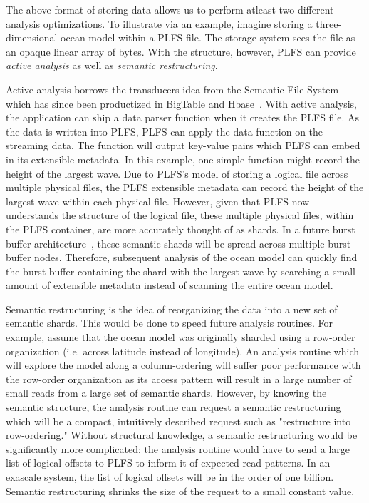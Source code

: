 The above format of storing data allows us to perform atleast two different analysis optimizations.  To illustrate via an example, imagine storing a three-dimensional ocean model within a PLFS file. The storage system sees the file as an opaque linear array of bytes.  With the structure, however, PLFS can provide \textit{active analysis} as well as \textit{semantic restructuring}.  

Active analysis borrows the transducers idea from the Semantic File System~\cite{semantic_fs} which has since been productized in BigTable and Hbase~\cite{google_coprocessors,GFS,apache_hbase}.  With active analysis, the application can ship a data parser function when it creates the PLFS file.  As the data is written into PLFS, PLFS can apply the data function on the streaming data.  The function will output key-value pairs which PLFS can embed in its extensible metadata.  In this example, one simple function might record the height of the largest wave.  Due to PLFS's model of storing a logical file across multiple physical files, the PLFS extensible metadata can record the height of the largest wave within each physical file.  However, given that PLFS now understands the structure of the logical file, these multiple physical files, within the PLFS container, are more accurately thought of as shards.  In a future burst buffer architecture~\cite{burst_buffers}, these semantic shards will be spread across multiple burst buffer nodes.  Therefore, subsequent analysis of the ocean model can quickly find the burst buffer containing the shard with the largest wave by searching a small amount of extensible metadata instead of scanning the entire ocean model.

Semantic restructuring is the idea of reorganizing the data into a new set of semantic shards.  This would be done to speed future analysis routines.  For example, assume that the ocean model was originally sharded using a row-order organization (i.e. across latitude instead of longitude).  An analysis routine which will explore the model along a column-ordering will suffer poor performance with the row-order organization as its access pattern will result in a large number of small reads from a large set of semantic shards.  However, by knowing the semantic structure, the analysis routine can request a semantic restructuring which will be a compact, intuitively described request such as "restructure into row-ordering."  Without structural knowledge, a semantic restructuring would be significantly more complicated: the analysis routine would have to send a large list of logical offsets to PLFS to inform it of expected read patterns.  In an exascale system, the list of logical offsets will be in the order of one billion.  Semantic restructuring shrinks the size of the request to a small constant value.


